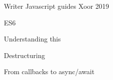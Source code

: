 


\begin{cventries}




\cventry
{Writer} %
{Javascript guides} %
{Xoor} %
{2019} %
{ %
\begin{cvitems}
\item {ES6}
\item {Understanding this}
\item {Destructuring}
\item {From callbacks to async/await}
\end{cvitems}
}

\end{cventries}
